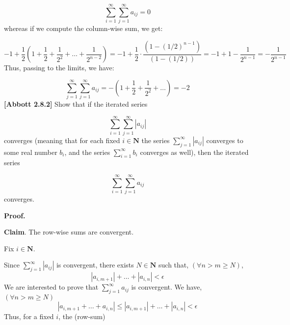 \documentclass[10pt]{article}
\begin{document}
\begin{equation*}
\sum _{i=1}^{\infty }\sum _{j=1}^{\infty } a_{ij} =0
\end{equation*}
whereas if we compute the column-wise sum, we get:


\begin{equation*}
-1+\frac{1}{2}\left( 1+\frac{1}{2} +\frac{1}{2^{2}} +\dotsc +\frac{1}{2^{n-2}}\right) =-1+\frac{1}{2} \cdot \frac{\left( 1-( 1/2)^{n-1}\right)}{( 1-( 1/2))} =-1+1-\frac{1}{2^{n-1}} =-\frac{1}{2^{n-1}}
\end{equation*}
Thus, passing to the limits, we have:


\begin{equation*}
\sum _{j=1}^{\infty }\sum _{j=1}^{\infty } a_{ij} =-\left( 1+\frac{1}{2} +\frac{1}{2^{2}} +\dotsc \right) =-2
\end{equation*}
\textbf{[Abbott 2.8.2]} Show that if the iterated series 


\begin{equation*}
\sum _{i=1}^{\infty }\sum _{j=1}^{\infty } |a_{ij} |
\end{equation*}
converges (meaning that for each fixed $\displaystyle i\in \mathbf{N}$ the series $\displaystyle \sum _{j=1}^{\infty } |a_{ij} |$ converges to some real number $\displaystyle b_{i}$, and the series $\displaystyle \sum _{i=1}^{\infty } b_{i}$ converges as well), then the iterated series 


\begin{equation*}
\sum _{i=1}^{\infty }\sum _{j=1}^{\infty } a_{ij}
\end{equation*}
converges.



\textbf{Proof.}



\textbf{Claim}. The row-wise sums are convergent.



Fix $\displaystyle i\in \mathbf{N}$.



Since $\displaystyle \sum _{j=1}^{\infty } |a_{ij} |$ is convergent, there exists $\displaystyle N\in \mathbf{N}$ such that, $\displaystyle ( \forall n >m\geq N)$, 
\begin{equation*}
| a_{i,m+1}| +\dotsc +| a_{i,n}| < \epsilon 
\end{equation*}
We are interested to prove that $\displaystyle \sum _{j=1}^{\infty } a_{ij}$ is convergent. We have, $\displaystyle ( \forall n >m\geq N)$
\begin{equation*}
|a_{i,m+1} +\dotsc +a_{i,n} |\leq | a_{i,m+1}| +\dotsc +| a_{i,n}| < \epsilon 
\end{equation*}
Thus, for a fixed $\displaystyle i$, the (row-sum) 
\end{document}
